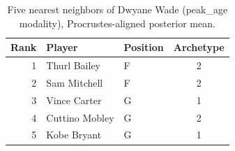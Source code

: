 \begin{table}[htbp]
  \centering\small
  \begin{tabular}{rllc}
    \toprule
    Rank & Player & Position & Archetype \\
    \midrule
    1 & Thurl Bailey & F & 2 \\
    2 & Sam Mitchell & F & 2 \\
    3 & Vince Carter & G & 1 \\
    4 & Cuttino Mobley & G & 2 \\
    5 & Kobe Bryant & G & 1 \\
    \bottomrule
  \end{tabular}
  \caption{Five nearest neighbors of Dwyane Wade (peak_age modality), Procrustes-aligned posterior mean.}
  \label{tab:Dwyane_Wade_neighbors_peak_age}
\end{table}

